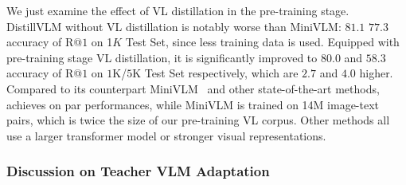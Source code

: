 We just examine the effect of VL distillation in the pre-training stage. 
DistillVLM without VL distillation is notably worse than MiniVLM: $81.1$ \vs $77.3$ accuracy of R@$1$ on 1$K$ Test Set,  since less training data is used. Equipped with pre-training stage VL distillation, it is significantly improved to $80.0$ and $58.3$ accuracy of R@$1$ on $1$K/$5$K Test Set respectively, which are $2.7$ and $4.0$ higher. Compared to its counterpart MiniVLM~\cite{wang2020minivlm} and other state-of-the-art methods, \distillvlm achieves on par performances, while MiniVLM is trained on 14M image-text pairs, which is twice the size of our pre-training VL corpus. Other methods all use a larger transformer model or stronger visual representations. 


\subsubsection{Discussion on Teacher VLM Adaptation}


